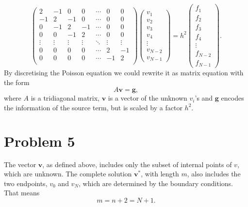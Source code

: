 \documentclass[english,notitlepage,aps,pra,10pt]{revtex4-2}
\newcommand{\bv}[1]{\mathbf{#1}}
\begin{document}
\begin{equation}
    \begin{pmatrix}
         2 & -1 &  0 &  0 & \cdots &  0 &  0 \\
        -1 &  2 & -1 &  0 & \cdots &  0 &  0 \\
         0 & -1 &  2 & -1 & \cdots &  0 &  0 \\
         0 &  0 & -1 &  2 & \cdots &  0 &  0 \\
        \vdots & \vdots & \vdots & \vdots & \ddots & \vdots  & \vdots\\
         0 &  0 &  0 &  0 & \cdots &  2 & -1 \\
         0 &  0 &  0 &  0 & \cdots & -1 &  2 \\
    \end{pmatrix}
    \begin{pmatrix}
        v_1 \\
        v_2 \\
        v_3 \\
        v_4 \\
        \vdots \\
        v_{N-2} \\
        v_{N-1}
    \end{pmatrix}
    =
    h^2
    \begin{pmatrix}
        f_1 \\
        f_2 \\
        f_3 \\
        f_4 \\
        \vdots \\
        f_{N-2} \\
        f_{N-1}
    \end{pmatrix}.
    \label{eq:discPoissonMat}
\end{equation}
By discretising the Poisson equation we could rewrite it as matrix equation with the form 
\begin{equation}
    A \bv{v} = \bv{g},
\end{equation}
where $A$ is a tridiagonal matrix, $\bv{v}$ is a vector of the unknown $v_i$'s and $\bv{g}$ encodes the information of the source term, but is scaled by a factor $h^2$. 


\section*{Problem 5}

The vector $\bv{v}$, as defined above, includes only the subset of internal points of $v$, which are unknown. The complete solution $\bv{v}^*$, with length $m$, also includes the two endpoints, $v_0$ and $v_N$, which are determined by the boundary conditions. That means
\begin{equation}
    m = n + 2 = N + 1.
\end{equation}
\end{document}
